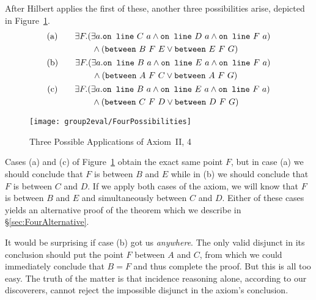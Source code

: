 After Hilbert applies the first of these, another three possibilities arise, depicted in Figure~\ref{fig:FourPossibilities}.
\begin{gather*}
\begin{split}\text{(a)}\qquad
&\exists F. (\exists a. \code{on\ line}\ C\ a \wedge \code{on\ line}\ D\ a \wedge \code{on\ line}\ F\ a)\\
&\qquad \wedge (\between{B}{F}{E} \vee \between{E}{F}{G})
\end{split}\\
\begin{split}\text{(b)}\qquad
&\exists F. (\exists a. \code{on\ line}\ B\ a \wedge \code{on\ line}\ E\ a \wedge \code{on\ line}\ F\ a)\\
&\qquad \wedge (\between{A}{F}{C} \vee \between{A}{F}{G})
\end{split}\\
\begin{split}\text{(c)}\qquad
&\exists F. (\exists a. \code{on\ line}\ B\ a \wedge \code{on\ line}\ E\ a \wedge \code{on\ line}\ F\ a)\\
&\qquad \wedge (\between{C}{F}{D} \vee \between{D}{F}{G}) 
\end{split}\\
\end{gather*}

\begin{figure}
  \texttt{[image: group2eval/FourPossibilities]}
  \caption{Three Possible Applications of Axiom~II, 4}
  \label{fig:FourPossibilities}
\end{figure}

Cases (a) and (c) of Figure~\ref{fig:FourPossibilities} obtain the exact same point $F$, but in case (a) we should conclude that $F$ is between $B$ and $E$ while in (b) we should conclude that $F$ is between $C$ and $D$. If we apply both cases of the axiom, we will know that $F$ is between $B$ and $E$ and simultaneously between $C$ and $D$. Either of these cases yields an alternative proof of the theorem which we describe in \S\ref{sec:FourAlternative}.

It would be surprising if case (b) got us \emph{anywhere}. The only valid disjunct in its conclusion should put the point $F$ between $A$ and $C$, from which we could immediately conclude that $B = F$ and thus complete the proof. But this is all too easy. The truth of the matter is that incidence reasoning alone, according to our discoverers, cannot reject the impossible disjunct in the axiom's conclusion.

